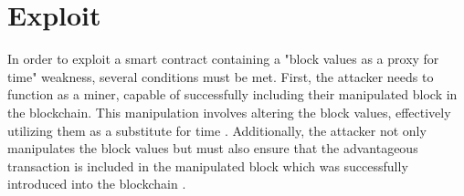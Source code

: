 \section{Exploit}
In order to exploit a smart contract containing a "block values as a proxy for time" weakness,
several conditions must be met. First, the attacker needs to function as a miner, capable of successfully
including their manipulated block in the blockchain. This manipulation involves altering the block values, effectively
utilizing them as a substitute for time \cite{swc116}.
Additionally, the attacker not only manipulates the block values but must also ensure that the advantageous transaction is included 
in the manipulated block which was successfully introduced into the blockchain \cite{cryptomarket}.